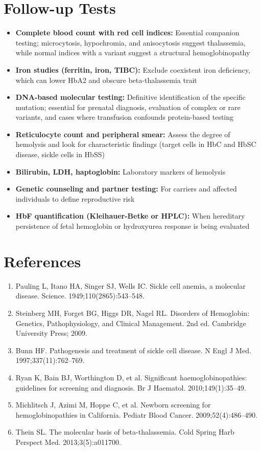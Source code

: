 \section*{Follow-up Tests}
\begin{itemize}
  \item \textbf{Complete blood count with red cell indices:} Essential companion testing; microcytosis, hypochromia, and anisocytosis suggest thalassemia, while normal indices with a variant suggest a structural hemoglobinopathy
  \item \textbf{Iron studies (ferritin, iron, TIBC):} Exclude coexistent iron deficiency, which can lower HbA2 and obscure beta-thalassemia trait
  \item \textbf{DNA-based molecular testing:} Definitive identification of the specific mutation; essential for prenatal diagnosis, evaluation of complex or rare variants, and cases where transfusion confounds protein-based testing
  \item \textbf{Reticulocyte count and peripheral smear:} Assess the degree of hemolysis and look for characteristic findings (target cells in HbC and HbSC disease, sickle cells in HbSS)
  \item \textbf{Bilirubin, LDH, haptoglobin:} Laboratory markers of hemolysis
  \item \textbf{Genetic counseling and partner testing:} For carriers and affected individuals to define reproductive risk
  \item \textbf{HbF quantification (Kleihauer-Betke or HPLC):} When hereditary persistence of fetal hemoglobin or hydroxyurea response is being evaluated
\end{itemize}

\section*{References}
\begin{enumerate}
  \item Pauling L, Itano HA, Singer SJ, Wells IC. Sickle cell anemia, a molecular disease. Science. 1949;110(2865):543--548.
  \item Steinberg MH, Forget BG, Higgs DR, Nagel RL. Disorders of Hemoglobin: Genetics, Pathophysiology, and Clinical Management. 2nd ed. Cambridge University Press; 2009.
  \item Bunn HF. Pathogenesis and treatment of sickle cell disease. N Engl J Med. 1997;337(11):762--769.
  \item Ryan K, Bain BJ, Worthington D, et al. Significant haemoglobinopathies: guidelines for screening and diagnosis. Br J Haematol. 2010;149(1):35--49.
  \item Michlitsch J, Azimi M, Hoppe C, et al. Newborn screening for hemoglobinopathies in California. Pediatr Blood Cancer. 2009;52(4):486--490.
  \item Thein SL. The molecular basis of beta-thalassemia. Cold Spring Harb Perspect Med. 2013;3(5):a011700.
\end{enumerate}

\clearpage
